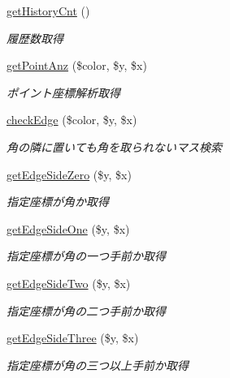 \begin{DoxyCompactItemize}
\hyperlink{class_reversi_a004834cf9f95ab56b62c1305bbc68ce2}{get\+History\+Cnt} ()
\begin{DoxyCompactList}\small\item\em 履歴数取得 \end{DoxyCompactList}\item 
\hyperlink{class_reversi_af1a30d438a7d17f31353b9d4bfe9cb65}{get\+Point\+Anz} (\$color, \$y, \$x)
\begin{DoxyCompactList}\small\item\em ポイント座標解析取得 \end{DoxyCompactList}\item 
\hyperlink{class_reversi_acd2c64ea43cc26407ad64920a183446b}{check\+Edge} (\$color, \$y, \$x)
\begin{DoxyCompactList}\small\item\em 角の隣に置いても角を取られないマス検索 \end{DoxyCompactList}\item 
\hyperlink{class_reversi_a76a7addedc2b0ba83c6b46ce0601076c}{get\+Edge\+Side\+Zero} (\$y, \$x)
\begin{DoxyCompactList}\small\item\em 指定座標が角か取得 \end{DoxyCompactList}\item 
\hyperlink{class_reversi_a98aff7f2db3a9feacbe98293c6b80eb4}{get\+Edge\+Side\+One} (\$y, \$x)
\begin{DoxyCompactList}\small\item\em 指定座標が角の一つ手前か取得 \end{DoxyCompactList}\item 
\hyperlink{class_reversi_a968982683aa41f50c83789a9be05aaba}{get\+Edge\+Side\+Two} (\$y, \$x)
\begin{DoxyCompactList}\small\item\em 指定座標が角の二つ手前か取得 \end{DoxyCompactList}\item 
\hyperlink{class_reversi_ab299d2488c8ab29f646e449d3204efbc}{get\+Edge\+Side\+Three} (\$y, \$x)
\begin{DoxyCompactList}\small\item\em 指定座標が角の三つ以上手前か取得 \end{DoxyCompactList}\end{DoxyCompactItemize}
